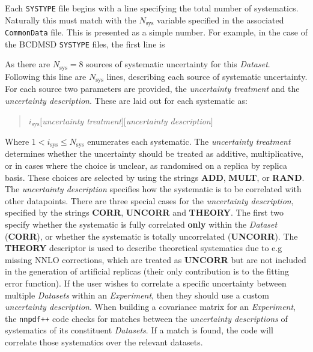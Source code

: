 \documentclass[11pt]{article}
\begin{document}
Each {\tt SYSTYPE} file begins with a line specifying the total number of systematics. Naturally this must match with the $N_{\text{sys}}$ variable specified in the associated {\tt CommonData} file. This is presented as a simple number. For example, in the case of the BCDMSD {\tt SYSTYPE} files, the first line is
\begin{quotation}
\end{quotation}
As there are $N_{\text{sys}}=8$ sources of systematic uncertainty for this \emph{Dataset}. Following this line are $N_{\text{sys}}$ lines, describing each source of systematic uncertainty. For each source two parameters are provided, the \emph{uncertainty treatment} and the \emph{uncertainty description}. These are laid out for each systematic as:
\begin{quotation}\noindent
$i_{\text{sys}}$\quad $[$\emph{uncertainty treatment}$]$\quad $[$\emph{uncertainty description}$]$
\end{quotation}
Where $1< i_{\text{sys}} \leq N_{\mathrm{sys}}$ enumerates each systematic. The \emph{uncertainty treatment} determines whether the uncertainty should be treated as additive, multiplicative, or in cases where the choice is unclear, as randomised on a replica by replica basis. These choices are selected by using the strings \textbf{ADD}, \textbf{MULT}, or \textbf{RAND}. The \emph{uncertainty description} specifies how the systematic is to be correlated with other datapoints. There are three special cases for the \emph{uncertainty description}, specified by the strings \textbf{CORR}, \textbf{UNCORR} and \textbf{THEORY}. The first two specify whether the systematic is fully correlated \textbf{only} within the \emph{Dataset} (\textbf{CORR}), or whether the systematic is totally uncorrelated (\textbf{UNCORR}). The \textbf{THEORY} descriptor is used to describe theoretical systematics due to e.g missing NNLO corrections, which are treated as \textbf{UNCORR} but are not included in the generation of artificial replicas (their only contribution is to the fitting error function). If the user wishes to correlate a specific uncertainty between multiple \emph{Datasets} within an \emph{Experiment}, then they should use a custom \emph{uncertainty description}. When building a covariance matrix for an \emph{Experiment}, the {\tt nnpdf++} code checks for matches between the \emph{uncertainty descriptions} of systematics of its constituent \emph{Datasets}. If a match is found, the code will correlate those systematics over the relevant datasets.
\end{document}

